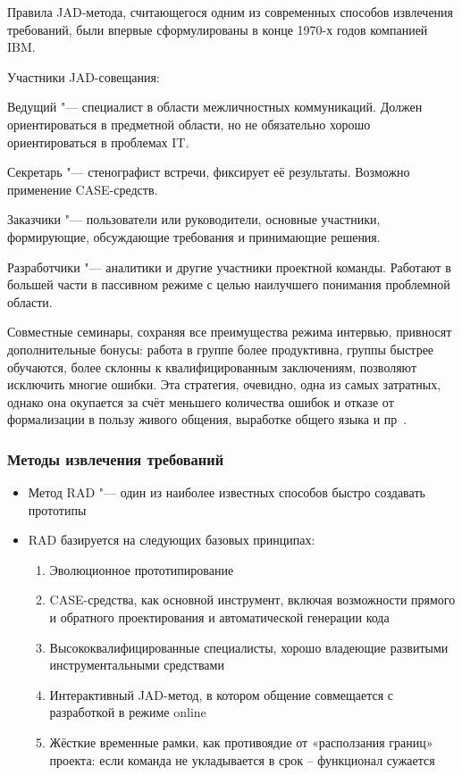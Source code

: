 \documentclass{../industrial-development}
\begin{document}
Правила JAD-метода, считающегося одним из современных способов извлечения требований, были впервые сформулированы в конце 1970-х годов компанией IBM.

Участники JAD-совещания:

\alert{Ведущий} "--- специалист в области межличностных коммуникаций. Должен ориентироваться в предметной области, но не обязательно хорошо ориентироваться в проблемах IT.

\alert{Секретарь} "--- стенографист встречи, фиксирует её результаты. Возможно применение CASE-средств.

\alert{Заказчики} "--- пользователи или руководители, основные участники, формирующие, обсуждающие требования и принимающие решения.

\alert{Разработчики} "--- аналитики и другие участники проектной команды. Работают в большей части в пассивном режиме с целью наилучшего понимания проблемной области.

Совместные семинары, сохраняя все преимущества режима интервью, привносят дополнительные бонусы: работа в группе более продуктивна, группы быстрее обучаются, более склонны к квалифицированным заключениям, позволяют исключить многие ошибки. Эта стратегия, очевидно, одна из самых затратных, однако она окупается за счёт меньшего количества ошибок и отказе от формализации в пользу живого общения,
выработке общего языка и пр~\cite[с.~33]{Maglinec}.


\begin{frame} \frametitle{Методы извлечения требований}
   
\begin{itemize}
\item \alert{Метод RAD} "--- один из наиболее известных способов быстро создавать прототипы
\item RAD базируется на следующих базовых принципах:
\begin{enumerate}
\item Эволюционное прототипирование
\item CASE-средства, как основной инструмент, включая возможности прямого и обратного проектирования и автоматической генерации кода
\item Высококвалифицированные специалисты, хорошо владеющие развитыми инструментальными средствами
\item Интерактивный JAD-метод, в котором общение совмещается с разработкой в режиме online
\item Жёсткие временные рамки, как противоядие от «расползания границ» проекта: если команда не укладывается в срок – функционал сужается
\end{enumerate}
\end{itemize}

\end{frame}
\lecturenotes
\end{document}

